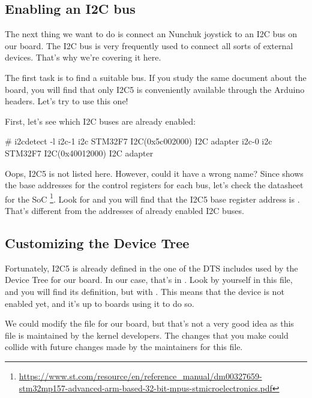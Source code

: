 \subsection{Enabling an I2C bus}

The next thing we want to do is connect an Nunchuk joystick
to an I2C bus on our board. The I2C bus is very frequently used
to connect all sorts of external devices. That's why we're covering
it here.

The first task is to find a suitable bus. If you study the
same document about the board, you will find that only I2C5 is
conveniently available through the Arduino headers. Let's try
to use this one!

First, let's see which I2C buses are already enabled:

\begin{bashinput}
# i2cdetect -l
i2c-1	i2c             STM32F7 I2C(0x5c002000)                 I2C adapter
i2c-0	i2c             STM32F7 I2C(0x40012000)                 I2C adapter
\end{bashinput}

Oops, I2C5 is not listed here. However, could it have a wrong name?
Since  shows the base addresses for the control
registers for each bus, let's check the datasheet for the SoC
\footnote{\url{https://www.st.com/resource/en/reference_manual/dm00327659-stm32mp157-advanced-arm-based-32-bit-mpus-stmicroelectronics.pdf}}.
Look for  and you will find that the I2C5 base register
address is . That's different from the addresses
of already enabled I2C buses.

\subsection{Customizing the Device Tree}

Fortunately, I2C5 is already defined in the one of the DTS includes
used by the Device Tree for our board. In our case, that's in
. Look by yourself in this
file, and you will find its definition, but with
. This means that the device is not enabled
yet, and it's up to boards using it to do so.

We could modify the  file
for our board, but that's not a very good idea as this file is
maintained by the kernel developers. The changes that you make could
collide with future changes made by the maintainers for this file.

